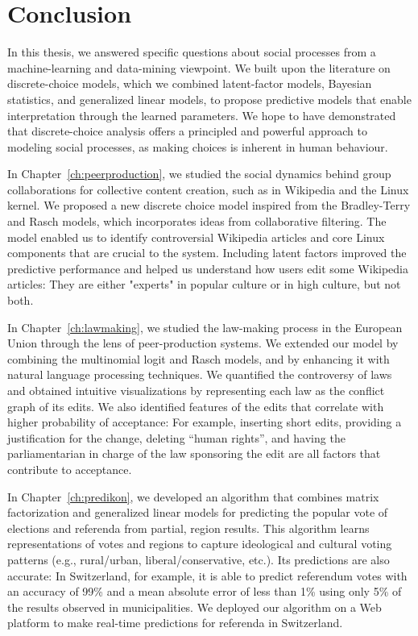 \chapter{Conclusion}
\label{ch:conclusion}

In this thesis, we answered specific questions about social processes from a machine-learning and data-mining viewpoint.
We built upon the literature on discrete-choice models, which we combined latent-factor models, Bayesian statistics, and generalized linear models, to propose predictive models that enable interpretation through the learned parameters.
We hope to have demonstrated that discrete-choice analysis offers a principled and powerful approach to modeling social processes, as making choices is inherent in human behaviour.

In Chapter~\ref{ch:peerproduction}, we studied the social dynamics behind group collaborations for collective content creation, such as in Wikipedia and the Linux kernel.
We proposed a new discrete choice model inspired from the Bradley-Terry and Rasch models, which incorporates ideas from collaborative filtering.
The model enabled us to identify controversial Wikipedia articles and core Linux components that are crucial to the system.
Including latent factors improved the predictive performance and helped us understand how users edit some Wikipedia articles:
They are either "experts" in popular culture or in high culture, but not both.

In Chapter~\ref{ch:lawmaking}, we studied the law-making process in the European Union through the lens of peer-production systems.
We extended our model by combining the multinomial logit and Rasch models, and by enhancing it with natural language processing techniques.
We quantified the controversy of laws and obtained intuitive visualizations by representing each law as the conflict graph of its edits.
We also identified features of the edits that correlate with higher probability of acceptance:
For example, inserting short edits, providing a justification for the change, deleting ``human rights'', and having the parliamentarian in charge of the law sponsoring the edit are all factors that contribute to acceptance.

In Chapter~\ref{ch:predikon}, we developed an algorithm that combines matrix factorization and generalized linear models for predicting the popular vote of elections and referenda from partial, region results.
This algorithm learns representations of votes and regions to capture ideological and cultural voting patterns (e.g., rural/urban, liberal/conservative, etc.).
Its predictions are also accurate: In Switzerland, for example, it is able to predict referendum votes with an accuracy of 99\% and a mean absolute error of less than 1\% using only 5\% of the results observed in municipalities.
We deployed our algorithm on a Web platform to make real-time predictions for referenda in Switzerland.

